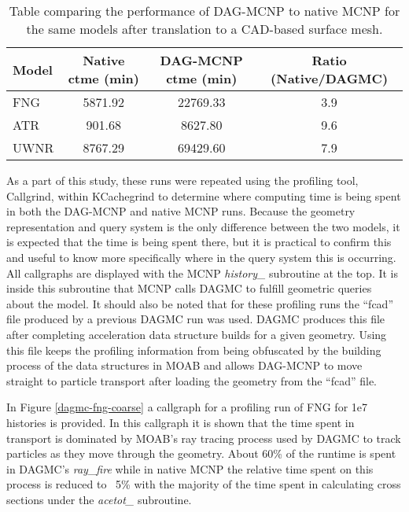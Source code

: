 \begin{table}[H]
  \centering
  \begin{tabular}{l c c c}
    \toprule
    Model & Native ctme (min) & DAG-MCNP ctme (min) & Ratio (Native/DAGMC) \\
    \hline
    FNG   & 5871.92           & 22769.33            & 3.9                  \\
    ATR   & 901.68            & 8627.80             & 9.6                  \\
    UWNR  & 8767.29           & 69429.60            & 7.9                  \\
    \hline
  \end{tabular}
  \caption{Table comparing the performance of DAG-MCNP to native MCNP for the
    same models after translation to a CAD-based surface mesh.}
  \label{dag-mcnp-benchmarks}  
\end{table}

As a part of this study, these runs were repeated using the profiling tool,
Callgrind, within KCachegrind to determine where computing time is being spent
in both the DAG-MCNP and native MCNP runs. Because the geometry representation
and query system is the only difference between the two models, it is expected
that the time is being spent there, but it is practical to confirm this and
useful to know more specifically where in the query system this is occurring. All
callgraphs are displayed with the MCNP \textit{history\_} subroutine at the
top. It is inside this subroutine that MCNP calls DAGMC to fulfill geometric
queries about the model. It should also be noted that for these profiling runs
the ``fcad'' file produced by a previous DAGMC run was used. DAGMC produces this
file after completing acceleration data structure builds for a given
geometry. Using this file keeps the profiling information from being obfuscated
by the building process of the data structures in MOAB and allows DAG-MCNP to
move straight to particle transport after loading the geometry from the ``fcad''
file.

In Figure \ref{dagmc-fng-coarse} a callgraph for a profiling run of FNG for 1e7
histories is provided. In this callgraph it is shown that the time spent in
transport is dominated by MOAB's ray tracing process used by DAGMC to track
particles as they move through the geometry. About 60\% of the runtime is spent
in DAGMC's \textit{ray\_fire} while in native MCNP the relative time spent on
this process is reduced to ~5\% with the majority of the time spent in
calculating cross sections under the \textit{acetot\_} subroutine.

